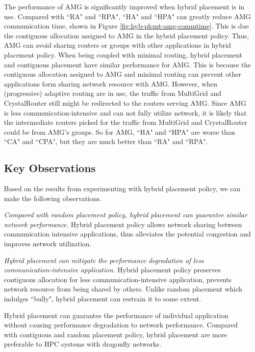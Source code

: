 \documentclass[conference,compsoc]{IEEEtran}
\begin{document}
The performance of AMG is significantly improved when hybrid placement is in use. Compared with ``RA" and ``RPA", ``HA" and ``HPA" can greatly reduce AMG communication time, shown in Figure \ref{fig:hyb-plcmt-amg-commtime}. This is due the contiguous allocation assigned to AMG in the hybrid placement policy. Thus, AMG can avoid sharing routers or groups with other applications in hybrid placement policy. When being coupled with minimal routing, 
hybrid placement and contiguous placement have similar performance for AMG. This is because the contiguous allocation assigned to AMG and minimal routing can prevent other applications  form sharing network resource with AMG. However, when (progressive) adaptive routing are in use, the traffic from MultiGrid and CrystalRouter still might be redirected to the routers serving AMG. Since AMG is less communication-intensive and can not fully utilize network, it is likely that the intermediate routers picked for the traffic from MultiGrid and CrystalRouter could be from AMG's groups. So for AMG, ``HA" and ``HPA" are worse than ``CA" and ``CPA", but they are much better than ``RA" and ``RPA".

\subsection{Key Observations}

Based on the results from experimenting with hybrid placement policy, we can make the following observations.

\emph{Compared with random placement policy, hybrid placement can guarantee similar network performance.} Hybrid placement policy allows network sharing between communication intensive applications, thus alleviates the potential congestion and improves network utilization.

\emph{Hybrid placement can mitigate the performance degradation of less communication-intensive application.} Hybrid placement policy preserves contiguous allocation for less communication-intensive application, prevents network resource from being shared by others. Unlike random placement which indulges ``bully", hybrid placement can restrain it to some extent.

Hybrid placement can guarantee the performance of individual application without causing performance degradation to network performance. Compared with contiguous and random placement policy, hybrid placement are more preferable to HPC systems with dragonfly networks.
\end{document}
